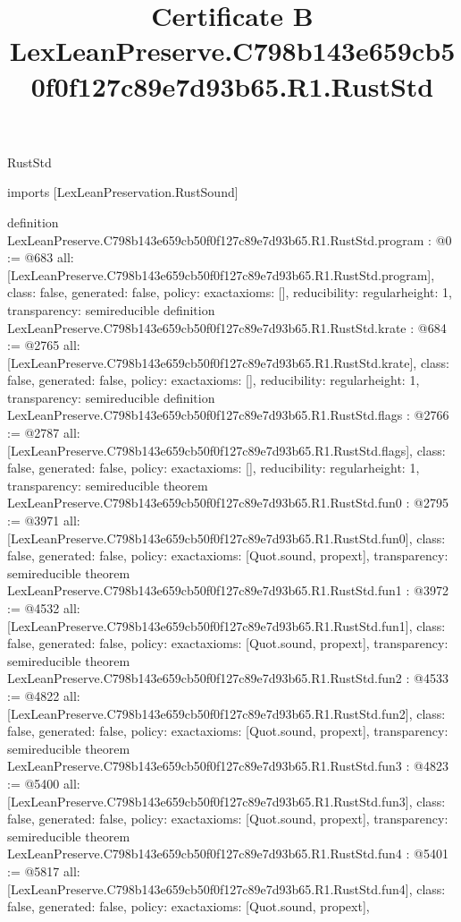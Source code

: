 \begin{lexlean}{RustStd}
\title{Certificate B LexLeanPreserve.C798b143e659cb50f0f127c89e7d93b65.R1.RustStd}
\begin{coremodule}
imports [LexLeanPreservation.RustSound]

definition LexLeanPreserve.C798b143e659cb50f0f127c89e7d93b65.R1.RustStd.program : @0 := @683 {
  all: [LexLeanPreserve.C798b143e659cb50f0f127c89e7d93b65.R1.RustStd.program],
  class: false,
  generated: false,
  policy: exact{axioms: []},
  reducibility: regular{height: 1},
  transparency: semireducible
}
definition LexLeanPreserve.C798b143e659cb50f0f127c89e7d93b65.R1.RustStd.krate : @684 := @2765 {
  all: [LexLeanPreserve.C798b143e659cb50f0f127c89e7d93b65.R1.RustStd.krate],
  class: false,
  generated: false,
  policy: exact{axioms: []},
  reducibility: regular{height: 1},
  transparency: semireducible
}
definition LexLeanPreserve.C798b143e659cb50f0f127c89e7d93b65.R1.RustStd.flags : @2766 := @2787 {
  all: [LexLeanPreserve.C798b143e659cb50f0f127c89e7d93b65.R1.RustStd.flags],
  class: false,
  generated: false,
  policy: exact{axioms: []},
  reducibility: regular{height: 1},
  transparency: semireducible
}
theorem LexLeanPreserve.C798b143e659cb50f0f127c89e7d93b65.R1.RustStd.fun0 : @2795 := @3971 {
  all: [LexLeanPreserve.C798b143e659cb50f0f127c89e7d93b65.R1.RustStd.fun0],
  class: false,
  generated: false,
  policy: exact{axioms: [Quot.sound, propext]},
  transparency: semireducible
}
theorem LexLeanPreserve.C798b143e659cb50f0f127c89e7d93b65.R1.RustStd.fun1 : @3972 := @4532 {
  all: [LexLeanPreserve.C798b143e659cb50f0f127c89e7d93b65.R1.RustStd.fun1],
  class: false,
  generated: false,
  policy: exact{axioms: [Quot.sound, propext]},
  transparency: semireducible
}
theorem LexLeanPreserve.C798b143e659cb50f0f127c89e7d93b65.R1.RustStd.fun2 : @4533 := @4822 {
  all: [LexLeanPreserve.C798b143e659cb50f0f127c89e7d93b65.R1.RustStd.fun2],
  class: false,
  generated: false,
  policy: exact{axioms: [Quot.sound, propext]},
  transparency: semireducible
}
theorem LexLeanPreserve.C798b143e659cb50f0f127c89e7d93b65.R1.RustStd.fun3 : @4823 := @5400 {
  all: [LexLeanPreserve.C798b143e659cb50f0f127c89e7d93b65.R1.RustStd.fun3],
  class: false,
  generated: false,
  policy: exact{axioms: [Quot.sound, propext]},
  transparency: semireducible
}
theorem LexLeanPreserve.C798b143e659cb50f0f127c89e7d93b65.R1.RustStd.fun4 : @5401 := @5817 {
  all: [LexLeanPreserve.C798b143e659cb50f0f127c89e7d93b65.R1.RustStd.fun4],
  class: false,
  generated: false,
  policy: exact{axioms: [Quot.sound, propext]},
}
\end{coremodule}
\end{lexlean}
